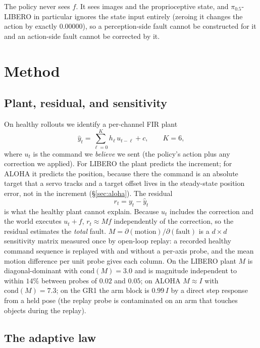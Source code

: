 \documentclass{article}
\begin{document}
The policy never sees $f$. It sees images and the proprioceptive state, and $\pi_{0.5}$-LIBERO
in particular ignores the state input entirely (zeroing it changes the action by exactly
$0.00000$), so a perception-side fault cannot be constructed for it and an action-side fault
cannot be corrected by it.

\section{Method}
\label{sec:method}

\subsection{Plant, residual, and sensitivity}

On healthy rollouts we identify a per-channel FIR plant
\begin{equation}
\hat y_t = \sum_{\ell=0}^{K} h_\ell\, u_{t-\ell} + c, \qquad K = 6,
\end{equation}
where $u_t$ is the command we \emph{believe} we sent (the policy's action plus any
correction we applied). For LIBERO the plant predicts the increment; for ALOHA it predicts
the position, because there the command is an absolute target that a servo tracks and a
target offset lives in the steady-state position error, not in the increment
(\S\ref{sec:aloha}). The residual
\begin{equation}
r_t = y_t - \hat y_t
\end{equation}
is what the healthy plant cannot explain. Because $u_t$ includes the correction and the
world executes $u_t + f$, $r_t \approx M f$ independently of the correction, so the residual
estimates the \emph{total} fault. $M = \partial(\text{motion})/\partial(\text{fault})$ is a
$d\times d$ sensitivity matrix measured once by open-loop replay: a recorded healthy command
sequence is replayed with and without a per-axis probe, and the mean motion difference per
unit probe gives each column. On the LIBERO plant $M$ is diagonal-dominant with
$\mathrm{cond}(M)=3.0$ and is magnitude independent to within $14\%$ between probes of
$0.02$ and $0.05$; on ALOHA $M\approx I$ with $\mathrm{cond}(M)=7.3$; on the GR1 the
arm block is $0.99\,I$ by a direct step response from a held pose (the replay probe is
contaminated on an arm that touches objects during the replay).

\subsection{The adaptive law}
\label{sec:law}
\end{document}
